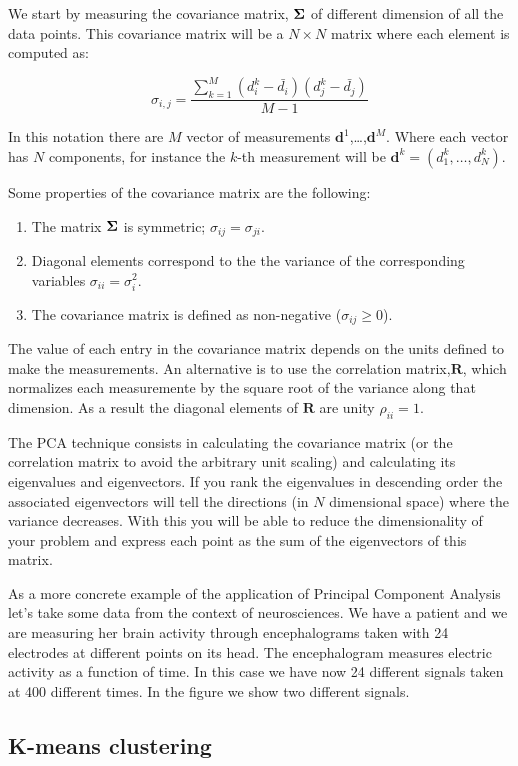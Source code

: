\documentclass{article}
\begin{document}
We start by measuring the covariance matrix, ${\bf\Sigma}$ of different dimension of all the data points. This covariance matrix will be a $N\times N$ matrix where each element is computed as:

\begin{equation}
\sigma_{i,j} = \frac{\sum_{k=1}^{M} (d^{k}_i - \bar{d_i})(d^{k}_j -\bar{d_{j}})}{M-1}
\end{equation}

In this notation there are $M$ vector of measurements ${\mathbf d}^{1}$,\ldots,${\mathbf d}^{M}$. Where each vector has $N$ components, for instance the $k$-th measurement will be ${\mathbf d}^{k}=(d^k_{1},\ldots,d^k_{N})$.

Some properties of the covariance matrix are the following:
\begin{enumerate}
\item The matrix ${\bf\Sigma}$ is symmetric;
  $\sigma_{ij}=\sigma_{ji}$.
\item Diagonal elements correspond to the the variance of the
  corresponding variables $\sigma_{ii}=\sigma_i^2$.
\item The covariance matrix is defined as non-negative
  ($\sigma_{ij}\geq 0$).
\end{enumerate}

The value of each entry in the covariance matrix depends on the units
defined to make the measurements. An alternative is to use the
correlation matrix,${\mathbf R}$, which normalizes each measuremente
by the square root of the variance along that dimension. As a result
the diagonal elements of ${\mathbf R}$ are unity $\rho_{ii}=1$.

The PCA technique consists in calculating the covariance matrix (or
the correlation matrix to avoid the arbitrary unit scaling) and
calculating its eigenvalues and eigenvectors. If you rank the
eigenvalues in descending order the associated eigenvectors will tell
the directions (in $N$ dimensional space) where the variance
decreases. With this you will be able to reduce the dimensionality of
your problem and express each point as the sum of the eigenvectors of
this matrix.

As a more concrete example of the application of Principal Component
Analysis let's take some data from the context of neurosciences. We
have a patient and we are measuring her brain activity through
encephalograms taken with 24 electrodes at different points on its
head. The encephalogram measures electric activity as a function of
time. In this case we have now 24 different signals taken at 400
different times. In the figure we show two different signals.


\subsection{K-means clustering}
\end{document}
